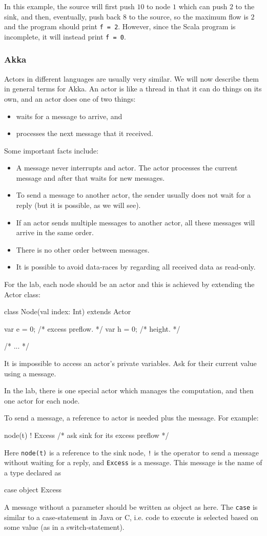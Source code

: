 \documentclass{forsete}
\begin{document}
In this example, the source will first push $10$ to node $1$ which can push $2$ to the sink, and then, eventually,
push back $8$ to the source, so the maximum flow is $2$ and the program should print {\tt f = 2}.
However, since the Scala program is incomplete, it will instead print {\tt f = 0}.

\subsubsection*{Akka}
Actors in different languages are usually very similar. We will now describe them in general terms for Akka.
An actor is like a thread in that it can do things on its own, and an actor does one of two things:
\begin{itemize}
\item waits for a message to arrive, and
\item processes the next message that it received.
\end{itemize}
Some important facts include:
\begin{itemize}
\item A message never interrupts and actor. The actor processes the current message and after that waits for new
messages.
\item To send a message to another actor, the sender usually does not wait for a reply (but it is possible, as we will see).
\item If an actor sends multiple messages to another actor, all these messages will arrive in the same order. 
\item There is no other order between messages.
\item It is possible to avoid data-races by regarding all received data as read-only.
\end{itemize}
For the lab, each node should be an actor and this is achieved by extending the Actor class:
\begin{ccode}
class Node(val index: Int) extends Actor {
	var	e = 0;				/* excess preflow. 						*/
	var	h = 0;				/* height. 							*/
   
        /* ... */
}
\end{ccode}

It is impossible to access an actor's private variables. Ask for their current value using a message.

In the lab, there is one special actor which manages the computation, and then one actor for each node.

To send a message, a reference to actor is needed plus the message. For example:
\begin{ccode}
node(t) ! Excess	/* ask sink for its excess preflow */
\end{ccode}
Here {\tt node(t)} is a reference to the sink node, \verb.!. is the operator to send a message without 
waiting for a reply, and \verb.Excess. is a message. This message is the name of a type declared as
\begin{ccode}
case object Excess
\end{ccode}
A message without a parameter should be written as object as here. The \verb.case. is similar to 
a case-statement in Java or C, i.e. code to execute is selected based on some value (as in a switch-statement).
\end{document}
